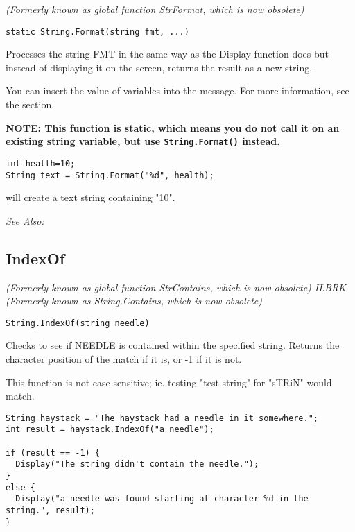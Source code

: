 \it{(Formerly known as global function StrFormat, which is now obsolete)}

\begin{verbatim}
static String.Format(string fmt, ...)
\end{verbatim}
Processes the string FMT in the same way as the Display function does but
instead of displaying it on the screen, returns the result as a new string.

You can insert the value of variables into the message. For more information,
see the  section.

\bf{NOTE:} This function is static, which means you do not call it on
an existing string variable, but use \verb$String.Format()$ instead.

\begin{verbatim}
int health=10;
String text = String.Format("%d", health);
\end{verbatim}
will create a text string containing "10".

\it{See Also:} 


\subsection{IndexOf}\label{String.IndexOf}%

\it{(Formerly known as global function StrContains, which is now obsolete)} ILBRK
\it{(Formerly known as String.Contains, which is now obsolete)}

\begin{verbatim}
String.IndexOf(string needle)
\end{verbatim}
Checks to see if NEEDLE is contained within the specified string. Returns the character position
of the match if it is, or -1 if it is not.

This function is not case sensitive; ie. testing "test string" for "sTRiN" would match.

\begin{verbatim}
String haystack = "The haystack had a needle in it somewhere.";
int result = haystack.IndexOf("a needle");

if (result == -1) {
  Display("The string didn't contain the needle.");
}
else {
  Display("a needle was found starting at character %d in the string.", result);
}
\end{verbatim}


